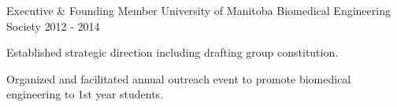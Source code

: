 \begin{cventries}
  \cventry
	{Executive \& Founding Member} %
	{University of Manitoba Biomedical Engineering Society} %
	{\toronto} %
	{2012 - 2014} %
	{
		\begin{cvitems} %
			\item {Established strategic direction including drafting group constitution.}
			\item {Organized and facilitated annual outreach event to promote biomedical engineering to 1st year students.}
		\end{cvitems}
	}

\end{cventries}
